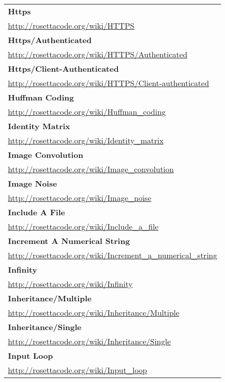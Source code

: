 \begin{longtable}{l}
\textbf{Https } \\ \href{http://rosettacode.org/wiki/HTTPS}{http://rosettacode.org/wiki/HTTPS} \\
\textbf{Https/Authenticated } \\ \href{http://rosettacode.org/wiki/HTTPS/Authenticated}{http://rosettacode.org/wiki/HTTPS/Authenticated} \\
\textbf{
Https/Client-Authenticated } \\ \href{http://rosettacode.org/wiki/HTTPS/Client-authenticated}{http://rosettacode.org/wiki/HTTPS/Client-authenticated} \\
\textbf{Huffman Coding } \\ \href{http://rosettacode.org/wiki/Huffman\_coding}{http://rosettacode.org/wiki/Huffman\_coding} \\
\textbf{Identity Matrix } \\ \href{http://rosettacode.org/wiki/Identity\_matrix}{http://rosettacode.org/wiki/Identity\_matrix} \\
\textbf{
Image Convolution } \\ \href{http://rosettacode.org/wiki/Image\_convolution}{http://rosettacode.org/wiki/Image\_convolution} \\
\textbf{Image Noise } \\ \href{http://rosettacode.org/wiki/Image\_noise}{http://rosettacode.org/wiki/Image\_noise} \\
\textbf{Include A File } \\ \href{http://rosettacode.org/wiki/Include\_a\_file}{http://rosettacode.org/wiki/Include\_a\_file} \\
\textbf{
Increment A Numerical String } \\ \href{http://rosettacode.org/wiki/Increment\_a\_numerical\_string}{http://rosettacode.org/wiki/Increment\_a\_numerical\_string} \\
\textbf{Infinity } \\ \href{http://rosettacode.org/wiki/Infinity}{http://rosettacode.org/wiki/Infinity} \\
\textbf{Inheritance/Multiple } \\ \href{http://rosettacode.org/wiki/Inheritance/Multiple}{http://rosettacode.org/wiki/Inheritance/Multiple} \\
\textbf{
Inheritance/Single } \\ \href{http://rosettacode.org/wiki/Inheritance/Single}{http://rosettacode.org/wiki/Inheritance/Single} \\
\textbf{Input Loop } \\ \href{http://rosettacode.org/wiki/Input\_loop}{http://rosettacode.org/wiki/Input\_loop} \\

\end{longtable}
